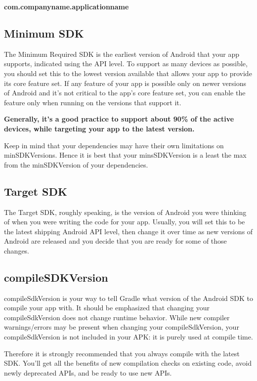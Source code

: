 \begin{center}
	\textbf{com.companyname.applicationname}
\end{center}

\subsection{Minimum SDK}
The Minimum Required SDK is the earliest version of Android that your app supports, indicated using the API level. To support as many devices as possible, you should set this to the lowest version available that allows your app to provide its core feature set. If any feature of your app is possible only on newer versions of Android and it's not critical to the app's core feature set, you can enable the feature only when running on the versions that support it.

\textbf{Generally, it’s a good practice to support about 90\% of the active devices, while targeting your app to the latest version.}

Keep in mind that your dependencies may have their own limitations on minSDKVersions. Hence it is best that your minsSDKVersion is a least the max from the minSDKVersion of your dependencies.

\subsection{Target SDK}
The Target SDK, roughly speaking, is the version of Android you were thinking of when you were writing the code for your app. Usually, you will set this to be the latest shipping Android API level, then change it over time as new versions of Android are released and you decide that you are ready for some of those changes.

\subsection{compileSDKVersion}
compileSdkVersion is your way to tell Gradle what version of the Android SDK to compile your app with. 
It should be emphasized that changing your compileSdkVersion does not change runtime behavior. While new compiler warnings/errors may be present when changing your compileSdkVersion, your compileSdkVersion is not included in your APK: it is purely used at compile time. 

Therefore it is strongly recommended that you always compile with the latest SDK. You’ll get all the benefits of new compilation checks on existing code, avoid newly deprecated APIs, and be ready to use new APIs.

